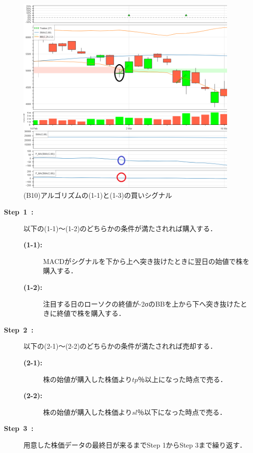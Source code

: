   \begin{figure}[H]
    \centering
    \includegraphics[width=110mm]{fig/bb_and_nk0_or_fma_paint.png}
    \caption{(B10)アルゴリズムの(1-1)と(1-3)の買いシグナル}
    \label{fig:bbnk0fma}
   \end{figure}
\begin{description}
  \item[\textbf{Step~1~:}]以下の(1-1)～(1-2)のどちらかの条件が満たされれば購入する．
  \begin{description}
    \item[\textbf{(1-1):}]MACDがシグナルを下から上へ突き抜けたときに翌日の始値で株を購入する．
    \item[\textbf{(1-2):}]注目する日のローソクの終値が-2σのBBを上から下へ突き抜けたときに終値で株を購入する．
   \end{description}  
  
  \item[\textbf{Step~2~:}]以下の(2-1)～(2-2)のどちらかの条件が満たされれば売却する．
   \begin{description}
    \item[\textbf{(2-1):}]株の始値が購入した株価より$tp$％以上になった時点で売る．
    \item[\textbf{(2-2):}]株の始値が購入した株価より$sl$％以下になった時点で売る． 
   \end{description}
  \item[\textbf{Step~3~:}]用意した株価データの最終日が来るまでStep 1からStep 3まで繰り返す．
  \end{description}
  


